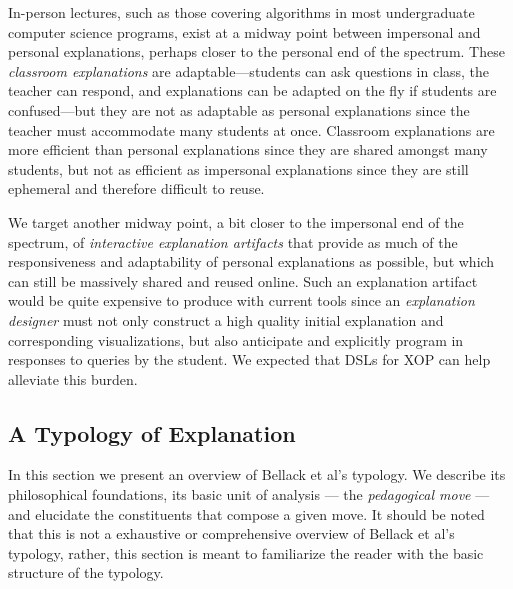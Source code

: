 \documentclass[conference]{IEEEtran}
\begin{document}
In-person lectures, such as those covering algorithms in most undergraduate
computer science programs, exist at a midway point between impersonal and
personal explanations, perhaps closer to the personal end of the spectrum.
These \emph{classroom explanations} are adaptable---students can ask questions
in class, the teacher can respond, and explanations can be adapted on the fly
if students are confused---but they are not as adaptable as personal
explanations since the teacher must accommodate many students at once.
Classroom explanations are more efficient than personal explanations since they
are shared amongst many students, but not as efficient as impersonal
explanations since they are still ephemeral and therefore difficult to reuse.


We target another midway point, a bit closer to the impersonal end of the
spectrum, of \emph{interactive explanation artifacts} that provide as much of
the responsiveness and adaptability of personal explanations as possible, but
which can still be massively shared and reused online. Such an explanation
artifact would be quite expensive to produce with current tools since an
\emph{explanation designer} must not only construct a high quality initial
explanation and corresponding visualizations, but also anticipate and
explicitly program in responses to queries by the student.
%
We expected that DSLs for XOP can help alleviate this burden.






\subsection{A Typology of Explanation}
\label{sec:back:typ}

In this section we present an overview of Bellack et al's typology. We describe
its philosophical foundations, its basic unit of analysis --- the
\emph{pedagogical move} --- and elucidate the constituents that compose a given
move. It should be noted that this is not a exhaustive or comprehensive overview
of Bellack et al's typology, rather, this section is meant to familiarize the
reader with the basic structure of the typology.
\end{document}
